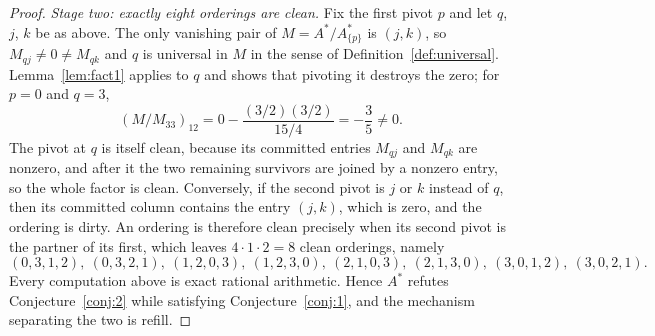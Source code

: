 \documentclass[11pt]{article}
\theoremstyle{plain}
\theoremstyle{definition}
\begin{document}
\begin{aiblock}
\begin{proof}
\emph{Stage two: exactly eight orderings are clean.} Fix the first pivot $p$ and let $q$, $j$, $k$ be
as above. The only vanishing pair of $M=A^*/A^*_{\{p\}}$ is $(j,k)$, so $M_{qj}\neq0\neq M_{qk}$ and
$q$ is universal in $M$ in the sense of Definition~\ref{def:universal}. Lemma~\ref{lem:fact1} applies
to $q$ and shows that pivoting it destroys the zero; for $p=0$ and $q=3$,
\[
  (M/M_{33})_{12}=0-\frac{(3/2)(3/2)}{15/4}=-\frac35\neq0 .
\]
The pivot at $q$ is itself clean, because its committed entries $M_{qj}$ and $M_{qk}$ are nonzero, and
after it the two remaining survivors are joined by a nonzero entry, so the whole factor is clean.
Conversely, if the second pivot is $j$ or $k$ instead of $q$, then its committed column contains the
entry $(j,k)$, which is zero, and the ordering is dirty. An ordering is therefore clean precisely when
its second pivot is the partner of its first, which leaves $4\cdot1\cdot2=8$ clean orderings, namely
\[
  (0,3,1,2),\ (0,3,2,1),\ (1,2,0,3),\ (1,2,3,0),\ (2,1,0,3),\ (2,1,3,0),\ (3,0,1,2),\ (3,0,2,1).
\]
Every computation above is exact rational arithmetic. Hence $A^*$ refutes
Conjecture~\ref{conj:2} while satisfying Conjecture~\ref{conj:1}, and the mechanism separating the two
is refill.
\end{proof}
\end{aiblock}
\end{document}
